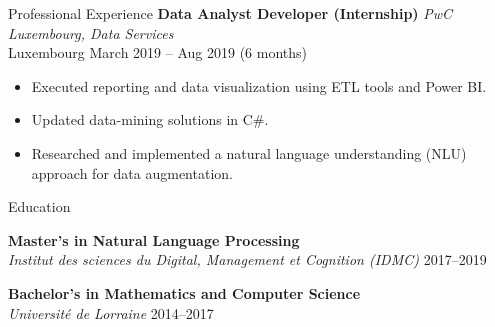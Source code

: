 \documentclass{resume} %
\begin{document}
\begin{rSection}{Professional Experience}
\textbf{Data Analyst Developer (Internship)} \hfill \textit{PwC Luxembourg, Data Services} \\
Luxembourg \hfill March 2019 -- Aug 2019 (6 months)
\begin{itemize}
    \item Executed reporting and data visualization using ETL tools and Power BI.
    \item Updated data-mining solutions in C\#.
    \item Researched and implemented a natural language understanding (NLU) approach for data augmentation.
\end{itemize}

\end{rSection} 

\begin{rSection}{Education}

\textbf{Master's in Natural Language Processing} \\
\textit{Institut des sciences du Digital, Management et Cognition (IDMC)} \hfill 2017--2019

\textbf{Bachelor's in Mathematics and Computer Science} \\
\textit{Université de Lorraine} \hfill 2014--2017 \\
\end{rSection} 
\end{document}

